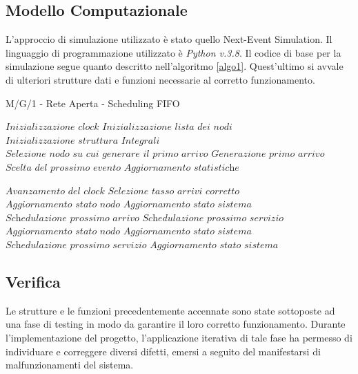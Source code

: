 \documentclass{article}
\begin{document}
\subsection{Modello Computazionale}
L’approccio di simulazione utilizzato è stato quello Next-Event Simulation. Il linguaggio di programmazione utilizzato è \textit{Python v.3.8}.
Il codice di base per la simulazione segue quanto descritto nell'algoritmo \ref{algo1}. Quest'ultimo si avvale di ulteriori strutture dati e funzioni necessarie al corretto funzionamento.

\begin{algorithm}[H]
\caption{M/G/1 - Rete Aperta - Scheduling FIFO}\label{algo1}
\begin{algorithmic}[1]
\State $\textit{Inizializzazione clock}$
\State $\textit{Inizializzazione lista dei nodi}$
\State $\textit{Inizializzazione struttura Integrali}$
\State $\textit{Selezione nodo su cui generare il primo arrivo}$
\State $\textit{Generazione primo arrivo}$
  \State $\textit{Scelta del prossimo evento}$
      \State $\textit{Aggiornamento statistiche}$
    \EndIf

  \EndFor
  \State $\textit{Avanzamento del clock}$
   
      \State $\textit{Selezione tasso arrivi corretto}$
    \EndIf
    \State $\textit{Aggiornamento stato nodo}$
    \State $\textit{Aggiornamento stato sistema}$
    \State $\textit{Schedulazione prossimo arrivo}$
      \State $\textit{Schedulazione prossimo servizio}$
    \EndIf
  \Else  {}
    \State $\textit{Aggiornamento stato nodo}$
      \State $\textit{Aggiornamento stato sistema}$
    \EndIf
      \State $\textit{Schedulazione prossimo servizio}$
    \EndIf
        \State $\textit{Aggiornamento stato sistema}$
      \EndIf
    \EndIf
  \EndIf
\EndWhile
\EndProcedure
\end{algorithmic}
\end{algorithm}


\subsection{Verifica}
Le strutture e le funzioni precedentemente accennate sono state sottoposte ad una fase di testing in modo da garantire il loro corretto funzionamento. Durante l'implementazione del progetto, l'applicazione iterativa di tale fase ha permesso di individuare e correggere diversi difetti, emersi a seguito del manifestarsi di malfunzionamenti del sistema.
\end{document}
